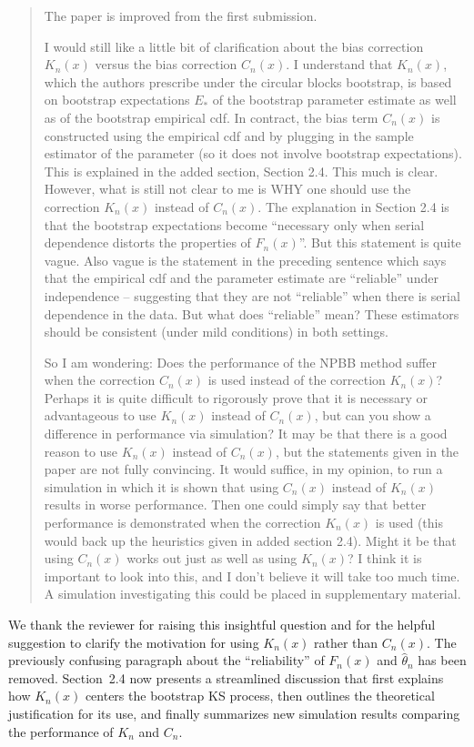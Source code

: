 \documentclass[12pt]{article}
\newenvironment{comment}%
{\begin{quotation}\noindent\small\it\color{darkblue}\ignorespaces%
}{\end{quotation}}
\begin{document}
\begin{comment}
The paper is improved from the first submission.


I would still like a little bit of clarification about the bias
correction $K_n(x)$ versus the bias correction $C_n(x)$. I understand
that $K_n(x)$, which the authors prescribe under the circular blocks
bootstrap, is based on bootstrap expectations $E_*$ of the bootstrap
parameter estimate as well as of the bootstrap empirical cdf. In
contract, the bias term $C_n(x)$ is constructed using the empirical
cdf and by plugging in the sample estimator of the parameter (so it
does not involve bootstrap expectations).  This is explained in the
added section, Section 2.4.  This much is clear. However, what is
still not clear to me is WHY one should use the correction $K_n(x)$
instead of $C_n(x)$. The explanation in Section 2.4 is that the
bootstrap expectations become ``necessary only when serial dependence
distorts the properties of $F_n(x)$''.  But this statement is quite
vague.  Also vague is the statement in the preceding sentence which
says that the empirical cdf and the parameter estimate are ``reliable''
under independence -- suggesting that they are not ``reliable'' when
there is serial dependence in the data.  But what does ``reliable''
mean? These estimators should be consistent (under mild conditions) in
both settings.


So I am wondering: Does the performance of the NPBB method suffer when
the correction $C_n(x)$ is used instead of the correction $K_n(x)$?
Perhaps it is quite difficult to rigorously prove that it is necessary
or advantageous to use $K_n(x)$ instead of $C_n(x)$, but can you show
a difference in performance via simulation?  It may be that there is a
good reason to use $K_n(x)$ instead of $C_n(x)$, but the statements
given in the paper are not fully convincing.   It would suffice, in my
opinion, to run a simulation in which it is shown that using $C_n(x)$
instead of $K_n(x)$ results in worse performance.  Then one could
simply say that better performance is demonstrated when the correction
$K_n(x)$ is used (this would back up the heuristics given in added
section 2.4). Might it be that using $C_n(x)$ works out just as well
as using $K_n(x)$?  I think it is important to look into this, and I
don't believe it will take too much time. A simulation investigating
this could be placed in supplementary material.
\end{comment}


We thank the reviewer for raising this insightful question and for the
helpful suggestion to clarify the motivation for using $K_n(x)$ rather
than $C_n(x)$.  The previously confusing paragraph about the
``reliability'' of $F_n(x)$ and $\hat\theta_n$ has been removed.
Section~2.4 now presents a streamlined discussion that first explains how
$K_n(x)$ centers the bootstrap KS process, then outlines the theoretical
justification for its use, and finally summarizes new simulation
results comparing the performance of $K_n$ and $C_n$.
\end{document}
